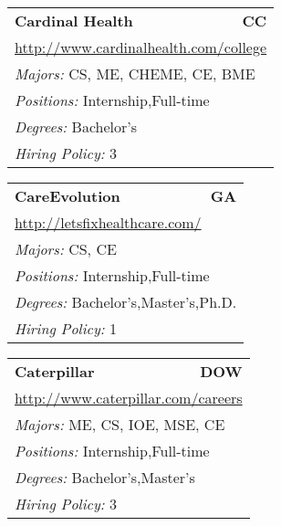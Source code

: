 \documentclass[twoside]{article}
\begin{document}
\begin{center}
\begin{multicols}{3}
\begin{FlushLeft}
\begin{minipage}{.9\columnwidth}
\end{minipage}
 
\begin{minipage}{.9\columnwidth}\begin{tabularx}{.95\columnwidth}{Xr}
                 {\Large\bf Cardinal Health} & {\Large\bf CC}\\
    \multicolumn{2}{p{.95\columnwidth}}{\url{http://www.cardinalhealth.com/college}}\\
    \multicolumn{2}{p{.95\columnwidth}}{\emph{Majors:} CS, ME, CHEME, CE, BME}\\
    \multicolumn{2}{p{.95\columnwidth}}{\emph{Positions:} Internship,Full-time}\\
    \multicolumn{2}{p{.95\columnwidth}}{\emph{Degrees:} Bachelor's}\\
    \multicolumn{2}{p{.95\columnwidth}}{\emph{Hiring Policy:} 3}\\
    \end{tabularx}
    
\end{minipage}
 
\begin{minipage}{.9\columnwidth}\begin{tabularx}{.95\columnwidth}{Xr}
                 {\Large\bf CareEvolution} & {\Large\bf GA}\\
    \multicolumn{2}{p{.95\columnwidth}}{\url{http://letsfixhealthcare.com/}}\\
    \multicolumn{2}{p{.95\columnwidth}}{\emph{Majors:} CS, CE}\\
    \multicolumn{2}{p{.95\columnwidth}}{\emph{Positions:} Internship,Full-time}\\
    \multicolumn{2}{p{.95\columnwidth}}{\emph{Degrees:} Bachelor's,Master's,Ph.D.}\\
    \multicolumn{2}{p{.95\columnwidth}}{\emph{Hiring Policy:} 1}\\
    \end{tabularx}
    
\end{minipage}
 
\begin{minipage}{.9\columnwidth}\begin{tabularx}{.95\columnwidth}{Xr}
                 {\Large\bf Caterpillar} & {\Large\bf DOW}\\
    \multicolumn{2}{p{.95\columnwidth}}{\url{http://www.caterpillar.com/careers}}\\
    \multicolumn{2}{p{.95\columnwidth}}{\emph{Majors:} ME, CS, IOE, MSE, CE}\\
    \multicolumn{2}{p{.95\columnwidth}}{\emph{Positions:} Internship,Full-time}\\
    \multicolumn{2}{p{.95\columnwidth}}{\emph{Degrees:} Bachelor's,Master's}\\
    \multicolumn{2}{p{.95\columnwidth}}{\emph{Hiring Policy:} 3}\\
    \end{tabularx}
    

\end{minipage}
\end{FlushLeft}
\end{multicols}
\end{center}
\end{document}
